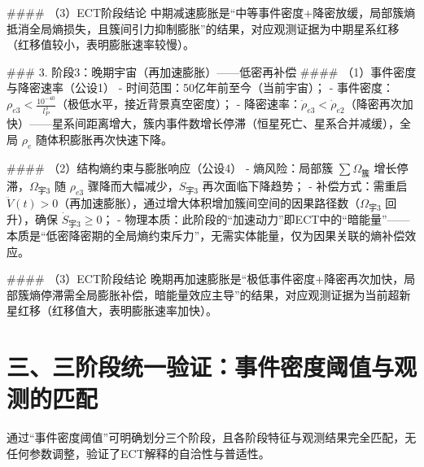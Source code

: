 \documentclass{article}
\begin{document}
#### （3）ECT阶段结论
中期减速膨胀是“中等事件密度+降密放缓，局部簇熵抵消全局熵损失，且簇间引力抑制膨胀”的结果，对应观测证据为中期星系红移（红移值较小，表明膨胀速率较慢）。

### 3. 阶段3：晚期宇宙（再加速膨胀）——低密再补偿
#### （1）事件密度与降密速率（公设1）
- 时间范围：50亿年前至今（当前宇宙）；
- 事件密度：\( \rho_{e3} < \frac{10^{-40}}{l_P^3} \)（极低水平，接近背景真空密度）；
- 降密速率：\( \dot{\rho}_{e3} < \dot{\rho}_{e2} \)（降密再次加快）——星系间距离增大，簇内事件数增长停滞（恒星死亡、星系合并减缓），全局 \( \rho_e \) 随体积膨胀再次快速下降。

#### （2）结构熵约束与膨胀响应（公设4）
- 熵风险：局部簇 \( \sum \Omega_{\text{簇}} \) 增长停滞，\( \Omega_{\text{宇3}} \) 随 \( \rho_{e3} \) 骤降而大幅减少，\( S_{\text{宇3}} \) 再次面临下降趋势；
- 补偿方式：需重启 \( \ddot{V}(t) > 0 \)（再加速膨胀），通过增大体积增加簇间空间的因果路径数（\( \Omega_{\text{宇3}} \) 回升），确保 \( \dot{S}_{\text{宇3}} \geq 0 \)；
- 物理本质：此阶段的“加速动力”即ECT中的“暗能量”——本质是“低密降密期的全局熵约束斥力”，无需实体能量，仅为因果关联的熵补偿效应。

#### （3）ECT阶段结论
晚期再加速膨胀是“极低事件密度+降密再次加快，局部簇熵停滞需全局膨胀补偿，暗能量效应主导”的结果，对应观测证据为当前超新星红移（红移值大，表明膨胀速率加快）。


\section*{三、三阶段统一验证：事件密度阈值与观测的匹配}
通过“事件密度阈值”可明确划分三个阶段，且各阶段特征与观测结果完全匹配，无任何参数调整，验证了ECT解释的自洽性与普适性。

\begin{table}[h!]
\centering
{}
\end{table}
\end{document}
